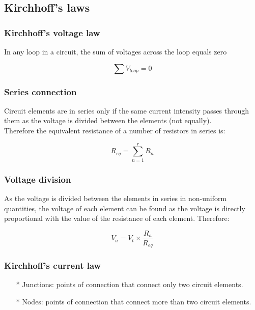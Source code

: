 \documentclass[a4paper]{book}
\begin{document}
\subsection{Kirchhoff's laws}

\subsubsection{Kirchhoff's voltage law}

In any loop in a circuit, the sum of voltages across the loop equals zero

\[\sum V_{loop} = 0\]

\subsubsection{Series connection}

Circuit elements are in series only if the same current intensity passes through them as the voltage is divided between the elements (not equally).\\
Therefore the equivalent resistance of a number of resistors in series is:

\[R_{eq} = \sum_{n = 1}^r R_{n}\]

\subsubsection{Voltage division}

As the voltage is divided between the elements in series in non-uniform quantities, the voltage of each element can be found as the voltage 
is directly proportional with the value of the resistance of each element. Therefore:

\[V_a = V_t \times \frac{R_a}{R_{eq}}\]

\subsubsection{Kirchhoff's current law}

\begin{itemize}


  \item[*] Junctions: points of connection that connect only two circuit elements.

  \item[*] Nodes: points of connection that connect more than two circuit elements.

\end{itemize}
\end{document}
